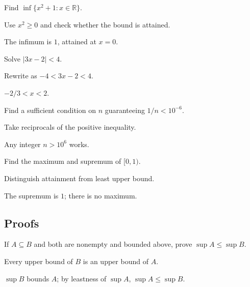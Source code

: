 \begin{exercise}\label{exr:ii01-expand-02}
Find \(\inf\{x^2+1:x\in\mathbb R\}\).
\end{exercise}
\begin{hint}
Use \(x^2\ge0\) and check whether the bound is attained.
\end{hint}
\begin{solution}
The infimum is \(1\), attained at \(x=0\).
\end{solution}

\begin{exercise}\label{exr:ii01-expand-03}
Solve \(|3x-2|<4\).
\end{exercise}
\begin{hint}
Rewrite as \(-4<3x-2<4\).
\end{hint}
\begin{solution}
\(-2/3<x<2\).
\end{solution}

\begin{exercise}\label{exr:ii01-expand-04}
Find a sufficient condition on \(n\) guaranteeing \(1/n<10^{-6}\).
\end{exercise}
\begin{hint}
Take reciprocals of the positive inequality.
\end{hint}
\begin{solution}
Any integer \(n>10^6\) works.
\end{solution}

\begin{exercise}\label{exr:ii01-expand-05}
Find the maximum and supremum of \([0,1)\).
\end{exercise}
\begin{hint}
Distinguish attainment from least upper bound.
\end{hint}
\begin{solution}
The supremum is \(1\); there is no maximum.
\end{solution}

\subsection*{Proofs}

\begin{exercise}\label{exr:ii01-expand-06}
If \(A\subseteq B\) and both are nonempty and bounded above, prove \(\sup A\le\sup B\).
\end{exercise}
\begin{hint}
Every upper bound of \(B\) is an upper bound of \(A\).
\end{hint}
\begin{solution}
\(\sup B\) bounds \(A\); by leastness of \(\sup A\), \(\sup A\le\sup B\).
\end{solution}


